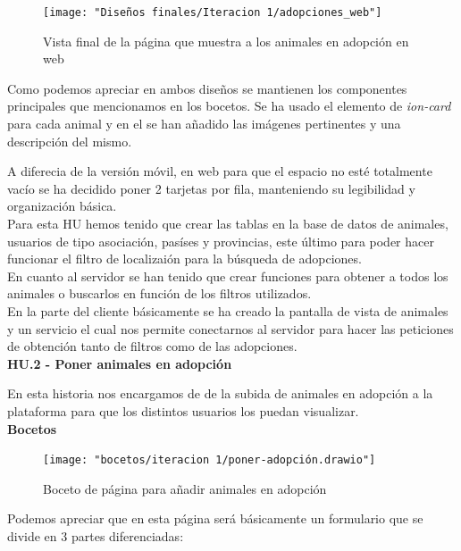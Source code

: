 \begin{figure}[H]
	\centering
	\texttt{[image: "Diseños finales/Iteracion 1/adopciones\_web"]}
	\caption{Vista final de la página que muestra a los animales en adopción en web}
	\label{fig:adopcionesDefWeb}
\end{figure}

Como podemos apreciar en ambos diseños se mantienen los componentes principales que mencionamos en los bocetos. Se ha usado el elemento de \textit{ion-card} para cada animal y en el se han añadido las imágenes pertinentes y una descripción del mismo.

A diferecia de la versión móvil, en web para que el espacio no esté totalmente vacío se ha decidido poner 2 tarjetas por fila, manteniendo su legibilidad y organización básica. \\

Para esta HU hemos tenido que crear las tablas en la base de datos de animales, usuarios de tipo asociación, pasíses y provincias, este último para poder hacer funcionar el filtro de localizaión para la búsqueda de adopciones. \\

En cuanto al servidor se han tenido que crear funciones para obtener a todos los animales o buscarlos en función de los filtros utilizados. \\

En la parte del cliente básicamente se ha creado la pantalla de vista de animales y un servicio el cual nos permite conectarnos al servidor para hacer las peticiones de obtención tanto de filtros como de las adopciones. \\ 



\Large{\textbf{HU.2 - Poner animales en adopción}}


En esta historia nos encargamos de de la subida de animales en adopción a la plataforma para que los distintos usuarios los puedan visualizar. \\

\textbf{Bocetos}

\begin{figure}[H]
	\centering
	\texttt{[image: "bocetos/iteracion 1/poner-adopción.drawio"]}
	\caption{Boceto de página para añadir animales en adopción}
	\label{fig:poner-adopcion}
\end{figure}

Podemos apreciar que en esta página será básicamente un formulario que se divide en 3 partes diferenciadas: \\ 

